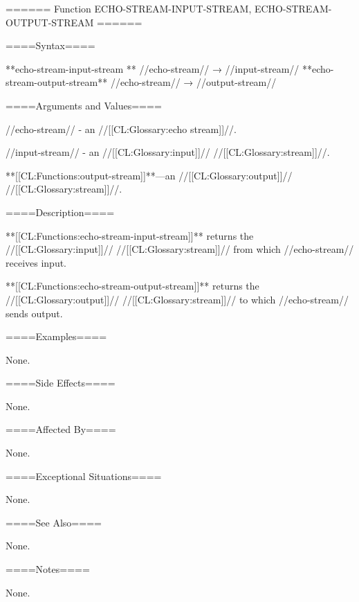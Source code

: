 ====== Function ECHO-STREAM-INPUT-STREAM, ECHO-STREAM-OUTPUT-STREAM ======

====Syntax====

**echo-stream-input-stream ** //echo-stream// → //input-stream// **echo-stream-output-stream** //echo-stream// → //output-stream//

====Arguments and Values====

//echo-stream// - an //[[CL:Glossary:echo stream]]//.

//input-stream// - an //[[CL:Glossary:input]]// //[[CL:Glossary:stream]]//.

**[[CL:Functions:output-stream]]**---an //[[CL:Glossary:output]]// //[[CL:Glossary:stream]]//.

====Description====

**[[CL:Functions:echo-stream-input-stream]]** returns the //[[CL:Glossary:input]]// //[[CL:Glossary:stream]]// from which //echo-stream// receives input.

**[[CL:Functions:echo-stream-output-stream]]** returns the //[[CL:Glossary:output]]// //[[CL:Glossary:stream]]// to which //echo-stream// sends output.

====Examples====

None.

====Side Effects====

None.

====Affected By====

None.

====Exceptional Situations====

None.

====See Also====

None.

====Notes====

None.

